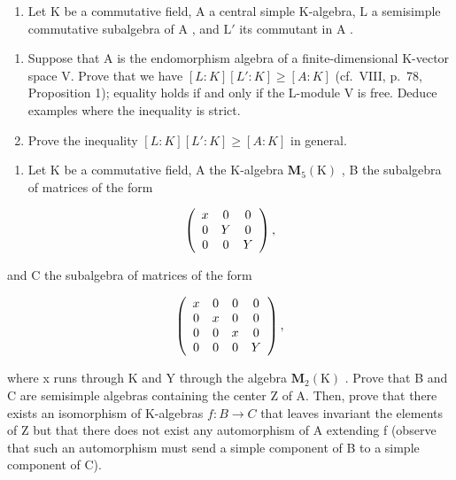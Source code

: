 
\begin{enumerate}
\def\labelenumi{\arabic{enumi})}
\tightlist
\item
  Let \(\mathrm{K}\) be a commutative field, \(\mathrm{A}\) a central simple K-algebra, \(\mathrm{L}\) a semisimple commutative subalgebra of \(\mathrm{A}\) , and \(\mathrm{L}'\) its commutant in \(\mathrm{A}\) .
\end{enumerate}

\begin{enumerate}
\def\labelenumi{\alph{enumi})}
\item
  Suppose that A is the endomorphism algebra of a finite-dimensional K-vector space V. Prove that we have \([L:K][L':K] \geqslant [A:K]\) (cf.~VIII, p.~78, Proposition 1); equality holds if and only if the L-module V is free. Deduce examples where the inequality is strict.
\item
  Prove the inequality \([L:K][L':K] \geqslant [A:K]\) in general.
\end{enumerate}

\begin{enumerate}
\def\labelenumi{\arabic{enumi})}
\setcounter{enumi}{1}
\tightlist
\item
  Let K be a commutative field, A the K-algebra \(\mathbf{M}_{5}(\mathrm{K})\) , B the subalgebra of matrices of the form
\end{enumerate}

\[
\left( \begin{array}{c c c} x & 0 & 0 \\ 0 & Y & 0 \\ 0 & 0 & Y \end{array} \right)  ,
\]

and C the subalgebra of matrices of the form

\[
\left( \begin{array}{c c c c} x & 0 & 0 & 0 \\ 0 & x & 0 & 0 \\ 0 & 0 & x & 0 \\ 0 & 0 & 0 & Y \end{array} \right)  ,
\]

where x runs through K and Y through the algebra \(\mathbf{M}_{2}(\mathrm{K})\) . Prove that B and C are semisimple algebras containing the center Z of A. Then, prove that there exists an isomorphism of K-algebras \(f: B \to C\) that leaves invariant the elements of Z but that there does not exist any automorphism of A extending f (observe that such an automorphism must send a simple component of B to a simple component of C).

